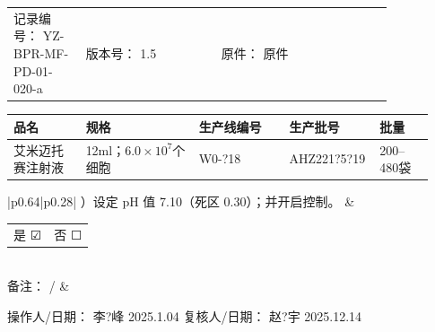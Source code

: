 \documentclass[UTF8,10pt,a4paper,fontset=fandol]{ctexart}
\newcommand{\fieldvalue}[1]{#1}
\newcommand{\handwritten}[1]{#1}
\newcommand{\checkboxfield}[1]{\ifstrequal{#1}{checked}{☑}{\ifstrequal{#1}{unclear}{?}{☐}}}
\begin{document}
\noindent
\begin{tabular}{@{}p{0.16\linewidth}p{0.30\linewidth}p{0.18\linewidth}p{0.20\linewidth}@{}}
记录编号：
\fieldvalue{YZ-BPR-MF-PD-01-020-a}
&
版本号：
\fieldvalue{1.5}
&
原件：
\fieldvalue{原件}
\end{tabular}

\vspace{0.5em}

\noindent
\begin{tabular}{|p{0.16\linewidth}|p{0.25\linewidth}|p{0.20\linewidth}|p{0.20\linewidth}|p{0.12\linewidth}|}
\hline
品名 & 规格 & 生产线编号 & 生产批号 & 批量 \\
\hline
\fieldvalue{艾米迈托赛注射液}
&
\fieldvalue{12ml；$6.0\times10^{7}$个细胞}
&
\fieldvalue{\handwritten{W0-?18}}
&
\fieldvalue{\handwritten{AHZ221?5?19}}
&
\fieldvalue{200--480袋}
\\
\hline
\end{tabular}

\vspace{0.5em}

\noindent
\begin{tabular}{|p{0.64\linewidth}|p{0.28\linewidth}|}
）设定 pH 值 7.10（死区 0.30）；并开启控制。 &
\begin{tabular}{@{}l@{\quad}l@{}}
是
\fieldvalue{\handwritten{\checkboxfield{checked}}}
&
否
\fieldvalue{\checkboxfield{unchecked}}
\end{tabular}
\\
\hline
备注：
\fieldvalue{\handwritten{/}}
&
\\
\hline
\end{tabular}

\vspace{0.6em}

\noindent
操作人/日期：
\fieldvalue{\handwritten{李?峰}}
\quad
\fieldvalue{\handwritten{2025.1.04}}
\hfill
复核人/日期：
\fieldvalue{\handwritten{赵?宇}}
\quad
\fieldvalue{\handwritten{2025.12.14}}
\end{document}
